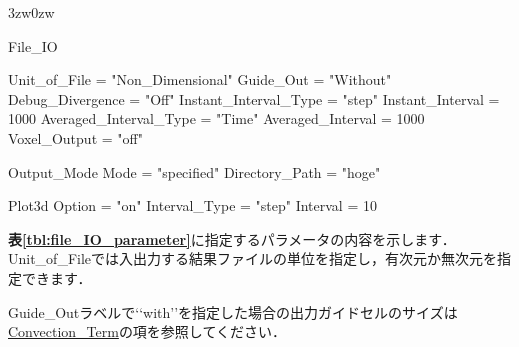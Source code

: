 \begin{indentation}{3zw}{0zw}

{\small
\begin{program}
  File_IO {
    Unit_of_File           = "Non_Dimensional"
    Guide_Out              = "Without"
    Debug_Divergence       = "Off"
    Instant_Interval_Type  = "step"
    Instant_Interval       = 1000
    Averaged_Interval_Type = "Time"
    Averaged_Interval      = 1000
    Voxel_Output           = "off"
    
    Output_Mode {
      Mode                 = "specified"
      Directory_Path       = "hoge"
    }
    
    Plot3d {
      Option               = "on"
      Interval_Type        = "step"
      Interval             = 10
    }
  }
\end{program}
}

\textbf{表\ref{tbl:file_IO_parameter}}に指定するパラメータの内容を示します．
Unit\_of\_Fileでは入出力する結果ファイルの単位を指定し，有次元か無次元を指定できます．

Guide\_Outラベルで\lq\lq with\rq\rq を指定した場合の出力ガイドセルのサイズは\hyperlink{tgt:convection_term}{Convection\_Term}の項を参照してください．



\end{indentation}
